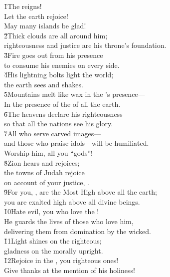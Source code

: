 \begin{poetry}
\poeml \v{1}The  reigns! \\
\poemll    Let the earth rejoice! \\
\poemlll       May many islands be glad! \\
\poeml \v{2}Thick clouds are all around him; \\
\poemll    righteousness and justice are his throne's foundation. \\
\poeml \v{3}Fire goes out from his presence \\
\poemll    to consume his enemies on every side. \\
\poeml \v{4}His lightning bolts light the world; \\
\poemll    the earth sees and shakes. \\
\poeml \v{5}Mountains melt like wax in the 's presence--- \\
\poemll    In the presence of the  of all the earth. \\
\poeml \v{6}The heavens declare his righteousness \\
\poemll    so that all the nations see his glory. \\
\poeml \v{7}All who serve carved images--- \\
\poemll    and those who praise idols---will be humiliated. \\
\poemlll       Worship him, all you ``gods''! \\
\poeml \v{8}Zion hears and rejoices; \\
\poemll    the towns of Judah rejoice \\
\poemlll       on account of your justice, . \\
\poeml \v{9}For you, , are the Most High above all the earth; \\
\poemll    you are exalted high above all divine beings. \\
\poeml \v{10}Hate evil, you who love the ! \\
\poemll    He guards the lives of those who love him, \\
\poemlll       delivering them from domination by the wicked. \\
\poeml \v{11}Light shines on the righteous; \\
\poemll    gladness on the morally upright. \\
\poeml \v{12}Rejoice in the , you righteous ones! \\
\poemll    Give thanks at the mention of his holiness!
\end{poetry}


